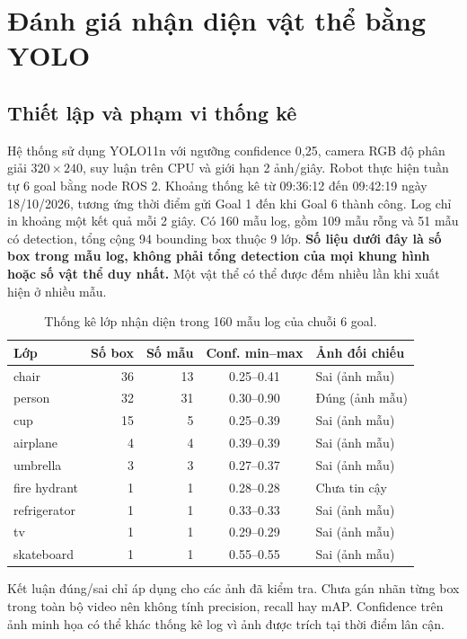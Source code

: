\section{Đánh giá nhận diện vật thể bằng YOLO}
\subsection{Thiết lập và phạm vi thống kê}
Hệ thống sử dụng YOLO11n với ngưỡng confidence 0,25, camera RGB độ phân giải $320\times240$, suy luận trên CPU và giới hạn 2 ảnh/giây. Robot thực hiện tuần tự 6 goal bằng node ROS 2.
Khoảng thống kê từ 09:36:12 đến 09:42:19 ngày 18/10/2026, tương ứng thời điểm gửi Goal 1 đến khi Goal 6 thành công. Log chỉ in khoảng một kết quả mỗi 2 giây. Có 160 mẫu log, gồm 109 mẫu rỗng và 51 mẫu có detection, tổng cộng 94 bounding box thuộc 9 lớp.
\textbf{Số liệu dưới đây là số box trong mẫu log, không phải tổng detection của mọi khung hình hoặc số vật thể duy nhất.} Một vật thể có thể được đếm nhiều lần khi xuất hiện ở nhiều mẫu.
\begin{table}[htbp]\centering\small
\caption{Thống kê lớp nhận diện trong 160 mẫu log của chuỗi 6 goal.}
\begin{tabular}{lrrcl}\hline
Lớp & Số box & Số mẫu & Conf. min--max & Ảnh đối chiếu \\ \hline
chair & 36 & 13 & 0.25--0.41 & Sai (ảnh mẫu) \\
person & 32 & 31 & 0.30--0.90 & Đúng (ảnh mẫu) \\
cup & 15 & 5 & 0.25--0.39 & Sai (ảnh mẫu) \\
airplane & 4 & 4 & 0.39--0.39 & Sai (ảnh mẫu) \\
umbrella & 3 & 3 & 0.27--0.37 & Sai (ảnh mẫu) \\
fire hydrant & 1 & 1 & 0.28--0.28 & Chưa tin cậy \\
refrigerator & 1 & 1 & 0.33--0.33 & Sai (ảnh mẫu) \\
tv & 1 & 1 & 0.29--0.29 & Sai (ảnh mẫu) \\
skateboard & 1 & 1 & 0.55--0.55 & Sai (ảnh mẫu) \\
\hline\end{tabular}\end{table}
Kết luận đúng/sai chỉ áp dụng cho các ảnh đã kiểm tra. Chưa gán nhãn từng box trong toàn bộ video nên không tính precision, recall hay mAP. Confidence trên ảnh minh họa có thể khác thống kê log vì ảnh được trích tại thời điểm lân cận.
